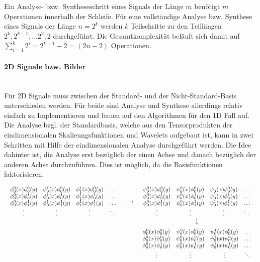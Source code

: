 \documentclass{article}
\begin{document}
\noindent Ein Analyse- bzw. Syntheseschritt eines Signals der Länge $m$ benötigt $m$ Operationen innerhalb der Schleife. Für eine vollständige Analyse bzw. Synthese eines Signals der Länge $n=2^k$ werden $k$ Teilschritte zu den Teillängen $2^k, 2^{k-1}, ... 2^2, 2$ durchgeführt. Die Gesamtkomplexität beläuft sich damit auf $\sum_{i=1}^k 2^i = 2^{k+1}-2 = (2n-2)$ Operationen.

\paragraph{2D Signale bzw. Bilder}~\\
Für 2D Signale muss zwischen der Standard- und der Nicht-Standard-Basis unterschieden werden. Für beide sind Analyse und Synthese allerdings relativ einfach zu Implementieren und bauen auf den Algorithmen für den 1D Fall auf.
Die Analyse bzgl. der Standardbasis, welche aus den Tensorprodukten der eindimensionalen Skalieungsfunktionen und Wavelets aufgebaut ist, kann in zwei Schritten mit Hilfe der eindimensionalen Analyse durchgeführt werden. Die Idee dahinter ist, die Analyse erst bezüglich der einen Achse und danach bezüglich der anderen Achse durchzuführen. Dies ist möglich, da die Basisfunktionen faktorisieren.

\[
\begin{array}{ccc}
{
\begin{array}{cccc}
\phi_0^0(x)\phi_0^0(y) & \phi_0^1(x)\phi_0^0(y) & \phi_1^1(x)\phi_0^0(y) & \hdots \\
\phi_0^0(x)\phi_0^1(y) & \phi_0^1(x)\phi_0^1(y) & \phi_1^1(x)\phi_0^1(y) & \hdots \\
\phi_0^0(x)\phi_1^1(y) & \phi_0^1(x)\phi_1^1(y) & \phi_1^1(x)\phi_1^1(y) & \hdots \\
\vdots & \vdots & \vdots & \ddots \\
\end{array}
} &
\longrightarrow &
{
\begin{array}{cccc}
\phi_0^0(x)\phi_0^0(y) & \psi_0^0(x)\phi_0^0(y) & \psi_0^1(x)\phi_0^0(y) & \hdots \\
\phi_0^0(x)\phi_0^1(y) & \psi_0^0(x)\phi_0^1(y) & \psi_0^1(x)\phi_0^1(y) & \hdots \\
\phi_0^0(x)\phi_1^1(y) & \psi_0^0(x)\phi_1^1(y) & \psi_0^1(x)\phi_1^1(y) & \hdots \\
\vdots & \vdots & \vdots & \ddots \\
\end{array}
} \\
 &
 &
\big\downarrow \\[.25cm]
 &
 &
{
\begin{array}{cccc}
\phi_0^0(x)\phi_0^0(y) & \psi_0^0(x)\phi_0^0(y) & \psi_0^1(x)\phi_0^0(y) & \hdots \\
\phi_0^0(x)\psi_0^0(y) & \psi_0^0(x)\psi_0^0(y) & \psi_0^1(x)\psi_0^0(y) & \hdots \\
\phi_0^0(x)\psi_0^1(y) & \psi_0^0(x)\psi_0^1(y) & \psi_0^1(x)\psi_0^1(y) & \hdots \\
\vdots & \vdots & \vdots & \ddots \\
\end{array}
}
\end{array}
\]
\end{document}
